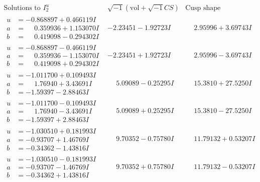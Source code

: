 \documentclass[1p]{elsarticle_modified}
\theoremstyle{definition}
\newcommand{\I}{\sqrt{-1}}
\begin{document}
$$\begin{array}{c|c|c}  
\text{Solutions to }I^u_{2}& \I (\text{vol} + \sqrt{-1}CS) & \text{Cusp shape}\\
 \hline 
\begin{aligned}
u &= -0.868897 + 0.466119 I \\
a &= \phantom{-}0.359936 + 1.153070 I \\
b &= \phantom{-}0.419098 - 0.294302 I\end{aligned}
 & -2.23451 - 1.92723 I & \phantom{-}2.95996 + 3.69743 I \\ \hline\begin{aligned}
u &= -0.868897 - 0.466119 I \\
a &= \phantom{-}0.359936 - 1.153070 I \\
b &= \phantom{-}0.419098 + 0.294302 I\end{aligned}
 & -2.23451 + 1.92723 I & \phantom{-}2.95996 - 3.69743 I \\ \hline\begin{aligned}
u &= -1.011700 + 0.109493 I \\
a &= \phantom{-}1.76940 + 3.43691 I \\
b &= -1.59397 - 2.88463 I\end{aligned}
 & \phantom{-}5.09089 - 0.25295 I & \phantom{-}15.3810 + 27.5250 I \\ \hline\begin{aligned}
u &= -1.011700 - 0.109493 I \\
a &= \phantom{-}1.76940 - 3.43691 I \\
b &= -1.59397 + 2.88463 I\end{aligned}
 & \phantom{-}5.09089 + 0.25295 I & \phantom{-}15.3810 - 27.5250 I \\ \hline\begin{aligned}
u &= -1.030510 + 0.181993 I \\
a &= -0.93707 + 1.46769 I \\
b &= -0.34362 - 1.43816 I\end{aligned}
 & \phantom{-}9.70352 - 0.75780 I & \phantom{-}11.79132 + 0.53207 I \\ \hline\begin{aligned}
u &= -1.030510 - 0.181993 I \\
a &= -0.93707 - 1.46769 I \\
b &= -0.34362 + 1.43816 I\end{aligned}
 & \phantom{-}9.70352 + 0.75780 I & \phantom{-}11.79132 - 0.53207 I \\ \hline\begin{aligned}

\end{aligned}
\end{array}$$
\end{document}
